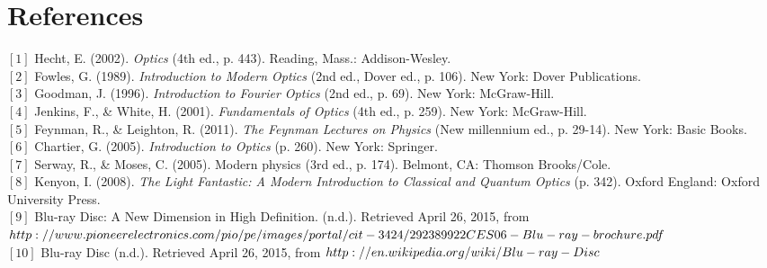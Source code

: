 \documentclass[a4paper,12pt]{report}
\begin{document}
\chapter{References}
$[1]$ Hecht, E. (2002). \textit{Optics} (4th ed., p. 443). Reading, Mass.: Addison-Wesley.\\
$[2]$ Fowles, G. (1989). \textit{Introduction to Modern Optics} (2nd ed., Dover ed., p. 106). New York: Dover Publications.\\
$[3]$ Goodman, J. (1996). \textit{Introduction to Fourier Optics} (2nd ed., p. 69). New York: McGraw-Hill.\\
$[4]$ Jenkins, F., \& White, H. (2001). \textit{Fundamentals of Optics} (4th ed., p. 259). New York: McGraw-Hill.\\
$[5]$ Feynman, R., \& Leighton, R. (2011). \textit{The Feynman Lectures on Physics} (New millennium ed., p. 29-14). New York: Basic Books.\\
$[6]$  Chartier, G. (2005). \textit{Introduction to Optics} (p. 260). New York: Springer.\\
$[7]$ Serway, R., \& Moses, C. (2005). Modern physics (3rd ed., p. 174). Belmont, CA: Thomson Brooks/Cole.\\
$[8]$ Kenyon, I. (2008). \textit{The Light Fantastic: A Modern Introduction to Classical and Quantum Optics} (p. 342). Oxford England: Oxford University Press.\\
$[9]$ Blu-ray Disc: A New Dimension in High Definition. (n.d.). Retrieved April 26, 2015, from $http://www.pioneerelectronics.com/pio/pe/images/p\\ortal/cit-3424/292389922CES06-Blu-ray-brochure.pdf$\\
$[10]$ Blu-ray Disc (n.d.). Retrieved April 26, 2015, from $http://en.wikipedia\\.org/wiki/Blu-ray-Disc$
\end{document}
